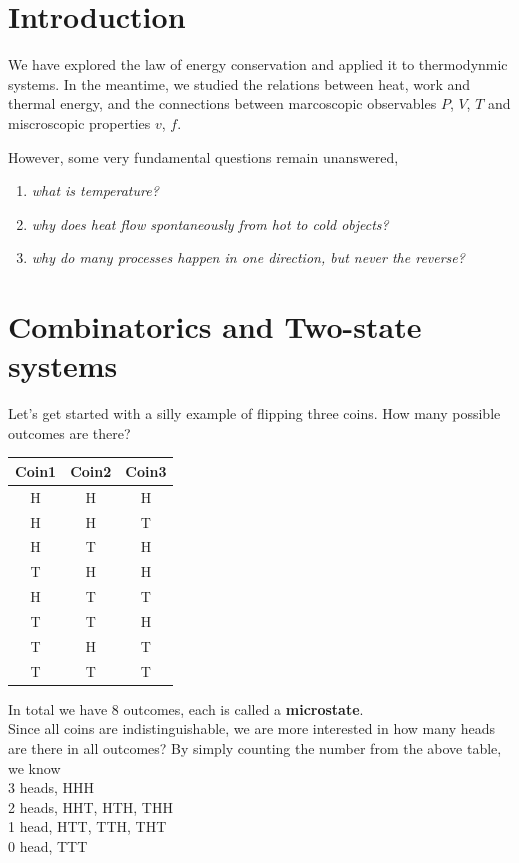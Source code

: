 

\section{Introduction}

We have explored the law of energy conservation and applied it to thermodynmic systems.
In the meantime, we studied the relations between heat, work and thermal energy,
and the connections between marcoscopic observables $P$, $V$, $T$ and miscroscopic properties $v$, $f$.

However, some very fundamental questions remain unanswered,
\begin{enumerate}
\item{\it what is temperature?}
\item{\it why does heat flow spontaneously from hot to cold objects?}
\item{\it why do many processes happen in one direction, but never the reverse?}
\end{enumerate}

\section{Combinatorics and Two-state systems}
Let's get started with a silly example of flipping three coins. How many possible outcomes are there?
\begin{tabular}{c c c}
Coin1 & Coin2 & Coin3 \\\hline
  H & H & H \\
  H & H & T \\
  H & T & H \\
  T & H & H \\
  H & T & T \\
  T & T & H \\
  T & H & T \\
  T & T & T \\\hline
\end{tabular}

In total we have 8 outcomes, each is called a {\bf microstate}.\\
Since all coins are indistinguishable, we are more interested in how many heads are there in all outcomes?
By simply counting the number from the above table, we know \\
3 heads,  HHH \\
2 heads,  HHT, HTH, THH \\
1 head,   HTT, TTH, THT \\
0 head,   TTT

